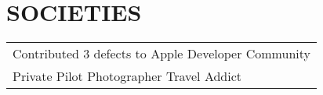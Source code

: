 \documentclass[a4paper]{lyu-resume} %
\begin{document}
\begin{minipage}[t]{0.66\textwidth}
\sectionspace %

\section{SOCIETIES} 

\begin{tabular}{l}
\textbullet{} Contributed 3 defects to Apple Developer Community\\
\textbullet{} Private Pilot \textbullet{} Photographer \textbullet{} Travel Addict
\end{tabular}

\sectionspace %
\end{minipage} %
\end{document}
